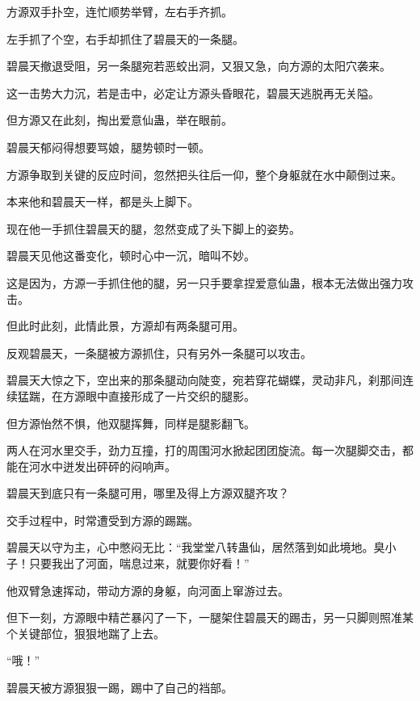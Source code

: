 
\begin{this_body}



方源双手扑空，连忙顺势举臂，左右手齐抓。

左手抓了个空，右手却抓住了碧晨天的一条腿。

碧晨天撤退受阻，另一条腿宛若恶蛟出洞，又狠又急，向方源的太阳穴袭来。

这一击势大力沉，若是击中，必定让方源头昏眼花，碧晨天逃脱再无关隘。

但方源又在此刻，掏出爱意仙蛊，举在眼前。

碧晨天郁闷得想要骂娘，腿势顿时一顿。

方源争取到关键的反应时间，忽然把头往后一仰，整个身躯就在水中颠倒过来。

本来他和碧晨天一样，都是头上脚下。

现在他一手抓住碧晨天的腿，忽然变成了头下脚上的姿势。

碧晨天见他这番变化，顿时心中一沉，暗叫不妙。

这是因为，方源一手抓住他的腿，另一只手要拿捏爱意仙蛊，根本无法做出强力攻击。

但此时此刻，此情此景，方源却有两条腿可用。

反观碧晨天，一条腿被方源抓住，只有另外一条腿可以攻击。

碧晨天大惊之下，空出来的那条腿动向陡变，宛若穿花蝴蝶，灵动非凡，刹那间连续猛踹，在方源眼中直接形成了一片交织的腿影。

但方源怡然不惧，他双腿挥舞，同样是腿影翻飞。

两人在河水里交手，劲力互撞，打的周围河水掀起团团旋流。每一次腿脚交击，都能在河水中迸发出砰砰的闷响声。

碧晨天到底只有一条腿可用，哪里及得上方源双腿齐攻？

交手过程中，时常遭受到方源的踢踹。

碧晨天以守为主，心中憋闷无比：“我堂堂八转蛊仙，居然落到如此境地。臭小子！只要我出了河面，喘息过来，就要你好看！”

他双臂急速挥动，带动方源的身躯，向河面上窜游过去。

但下一刻，方源眼中精芒暴闪了一下，一腿架住碧晨天的踢击，另一只脚则照准某个关键部位，狠狠地踹了上去。

“哦！”

碧晨天被方源狠狠一踢，踢中了自己的裆部。


\end{this_body}
